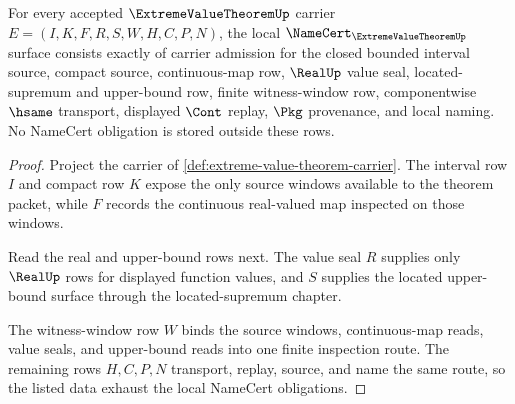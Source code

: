 \begin{theorem}
\label{thm:extreme-value-theorem-namecert-obligations}
For every accepted $\ExtremeValueTheoremUp$ carrier $E=(I,K,F,R,S,W,H,C,P,N)$, the local $\NameCert_{\ExtremeValueTheoremUp}$ surface consists exactly of carrier admission for the closed bounded interval source, compact source, continuous-map row, $\RealUp$ value seal, located-supremum and upper-bound row, finite witness-window row, componentwise $\hsame$ transport, displayed $\Cont$ replay, $\Pkg$ provenance, and local naming. No NameCert obligation is stored outside these rows.
\end{theorem}
\begin{proof}
Project the carrier of \autoref{def:extreme-value-theorem-carrier}. The interval row $I$ and compact row $K$ expose the only source windows available to the theorem packet, while $F$ records the continuous real-valued map inspected on those windows.

Read the real and upper-bound rows next. The value seal $R$ supplies only $\RealUp$ rows for displayed function values, and $S$ supplies the located upper-bound surface through the located-supremum chapter.

The witness-window row $W$ binds the source windows, continuous-map reads, value seals, and upper-bound reads into one finite inspection route. The remaining rows $H,C,P,N$ transport, replay, source, and name the same route, so the listed data exhaust the local NameCert obligations.
\end{proof}


